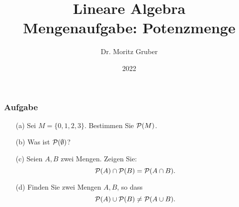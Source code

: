 

\title{Lineare Algebra\\[3mm] 
	\large Mengenaufgabe: Potenzmenge
}
\author{Dr. Moritz Gruber} 
\date{2022}



%
\begin{frame}[plain] 
 \titlepage
\end{frame}
%
%
\begin{frame} \frametitle{Aufgabe}


\begin{itemize}
	\item[(a)]Sei $M = \{0,1,2,3\}.$ Bestimmen Sie ${\cal P}(M)$.
	\item[(b)] Was ist ${\cal P}(\emptyset)$?
	\item[(c)] Seien $A, B$ zwei Mengen. Zeigen Sie:
			$$
				{\cal P}(A) \cap {\cal P}(B) = {\cal P}(A\cap B).
			$$
	\item[(d)] Finden Sie zwei Mengen $A,B$, so dass
			$$
				{\cal P}(A) \cup {\cal P}(B) \neq {\cal P}(A\cup B).
			$$
\end{itemize}
\end{frame}

